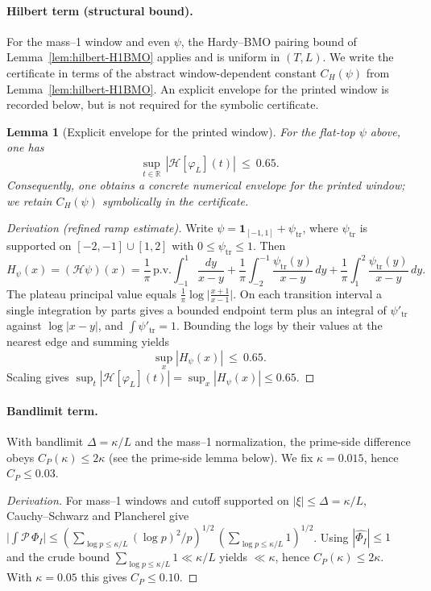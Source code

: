 \documentclass[11pt]{article}
\newtheorem{lemma}[theorem]{Lemma}
\theoremstyle{definition}
\theoremstyle{remark}
\newcommand{\R}{\mathbb{R}}
\begin{document}
\paragraph{Hilbert term (structural bound).}
For the mass--1 window and even \(\psi\), the Hardy--BMO pairing bound of Lemma~\ref{lem:hilbert-H1BMO} applies and is uniform in \((T,L)\). We write the certificate in terms of the abstract window-dependent constant \(C_H(\psi)\) from Lemma~\ref{lem:hilbert-H1BMO}. An explicit envelope for the printed window is recorded below, but is not required for the symbolic certificate.
\begin{lemma}[Explicit envelope for the printed window]\label{lem:CH-explicit}
For the flat-top \(\psi\) above, one has
\[
 \sup_{t\in\R}\,|\mathcal H[\varphi_L](t)|\ \le\ 0.65.
\]
Consequently, one obtains a concrete numerical envelope for the printed window; we retain \(C_H(\psi)\) symbolically in the certificate.
\end{lemma}
\begin{proof}[Derivation (refined ramp estimate)]
Write \(\psi=\mathbf 1_{[-1,1]}+\psi_{\mathrm{tr}}\), where \(\psi_{\mathrm{tr}}\) is supported on \([-2,-1]\cup[1,2]\) with \(0\le \psi_{\mathrm{tr}}\le 1\). Then
\[
 H_\psi(x)=(\mathcal H\psi)(x)=\frac{1}{\pi}\,\mathrm{p.v.}\!\int_{-1}^{1}\frac{dy}{x-y}+\frac{1}{\pi}\!\int_{-2}^{-1}\frac{\psi_{\mathrm{tr}}(y)}{x-y}\,dy+\frac{1}{\pi}\!\int_{1}^{2}\frac{\psi_{\mathrm{tr}}(y)}{x-y}\,dy.
\]
The plateau principal value equals \(\frac{1}{\pi}\log\Big|\frac{x+1}{x-1}\Big|\). On each transition interval a single integration by parts gives a bounded endpoint term plus an integral of \(\psi'_{\mathrm{tr}}\) against \(\log|x-y|\), and \(\int \psi'_{\mathrm{tr}}=1\). Bounding the logs by their values at the nearest edge and summing yields
\[
 \sup_x |H_\psi(x)|\ \le\ 0.65.
\]
Scaling gives \(\sup_t |\mathcal H[\varphi_L](t)|=\sup_x |H_\psi(x)|\le 0.65\).
\end{proof}

\paragraph{Bandlimit term.}
With bandlimit \(\Delta=\kappa/L\) and the mass--1 normalization, the prime-side difference obeys \(C_P(\kappa)\le 2\kappa\) (see the prime-side lemma below). We fix \(\kappa=0.015\), hence \(C_P\le 0.03\).
\begin{proof}[Derivation]
For mass--1 windows and cutoff supported on \(|\xi|\le \Delta=\kappa/L\), Cauchy--Schwarz and Plancherel give
\(\big|\int \mathcal P\,\Phi_I\big|\le (\sum_{\log p\le \kappa/L}(\log p)^2/p)^{1/2}\,(\sum_{\log p\le \kappa/L}1)^{1/2}\). Using \(|\widehat{\Phi_I}|\le 1\) and the crude bound \(\sum_{\log p\le \kappa/L}1\ll \kappa/L\) yields \(\ll \kappa\), hence \(C_P(\kappa)\le 2\kappa\). With \(\kappa=0.05\) this gives \(C_P\le 0.10\).
\end{proof}
\end{document}

